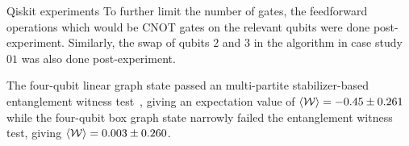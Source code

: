 \documentclass[final]{beamer}
\newlength{\colwidth}
\begin{document}
\begin{frame}[t]
\begin{columns}[t]
\begin{column}{\colwidth}
\begin{block}{Qiskit experiments}
                    To further limit the number of gates, the feedforward
                    operations which would be CNOT gates on the
                    relevant qubits were done post-experiment. Similarly, the swap of
                    qubits $2$ and $3$ in the algorithm in case study $01$ was
                    also done post-experiment.

                    The four-qubit linear graph state passed an multi-partite
                    stabilizer-based entanglement witness
                    test~\cite{PhysRevA.72.022340}, giving an expectation value of
                    $\expval{\mathcal{W}} = -0.45 \pm 0.261$ while the four-qubit
                    box graph state narrowly failed the entanglement witness
                    test, giving $\expval{\mathcal{W}} = 0.003 \pm 0.260$.


\end{block}
\end{column}
\end{columns}
\end{frame}
\end{document}
